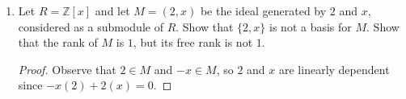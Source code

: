 \documentclass{report}
\newcommand{\Z}{\mathbb{Z}}
\DeclareMathOperator{\rk}{rank}
\begin{document}
\begin{enumerate}
\begin{enumerate} [label=(\alph*)]
\begin{proof}
					It follows that $\rk M / N = \rk M - \rk N = 0$, so $M / N$ is torsion.
				\end{proof}
			\item Prove conversely that if $M$ contains a submodule $N$ that is free of rank $n$ such that the quotient $M / N$ is torsion, then $M$ has rank $n$.
				\begin{proof}
					Let $y_1,...,y_{n+1}$ be any $n+1$ elements of $M$ and let $x_1,...,x_n$ be a basis for $N$. 
					Since $M / N$ is torsion, there is an $r_i\in R$ to each $y_i$ such that $r_iy_i=a_1x_1+...+a_nx_n$ for some $a_i\in R$.
					Thus, it is clear that the $r_iy_i$ are linearly independent, and so too are the $y_i$.
				\end{proof}
		\end{enumerate}
		\setcounter{enumi}{4}
	\item Let $R=\Z[x]$ and let $M=(2,x)$ be the ideal generated by $2$ and $x$, considered as a submodule of $R$. Show that $\{2,x\}$ is not a basis for $M$.
		Show that the rank of $M$ is $1$, but its free rank is not $1$.
		\begin{proof}
			Observe that $2\in M$ and $-x\in M$, so $2$ and $x$ are linearly dependent since $-x(2)+2(x)=0$. 
			\newline


\end{proof}
\end{enumerate}
\end{document}
